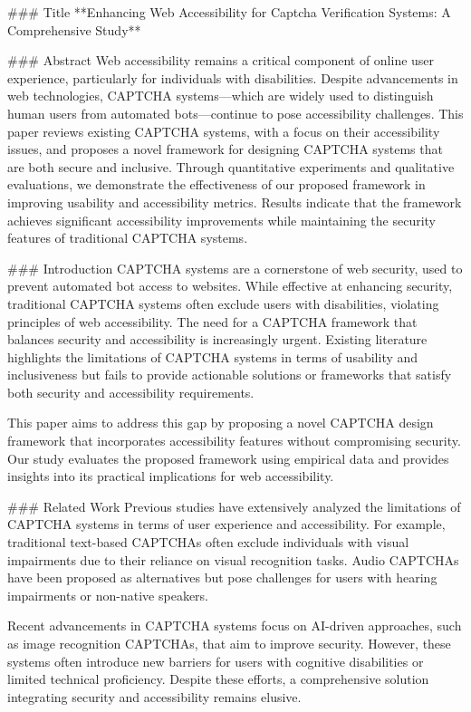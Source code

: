 ### Title  
**Enhancing Web Accessibility for Captcha Verification Systems: A Comprehensive Study**

### Abstract  
Web accessibility remains a critical component of online user experience, particularly for individuals with disabilities. Despite advancements in web technologies, CAPTCHA systems—which are widely used to distinguish human users from automated bots—continue to pose accessibility challenges. This paper reviews existing CAPTCHA systems, with a focus on their accessibility issues, and proposes a novel framework for designing CAPTCHA systems that are both secure and inclusive. Through quantitative experiments and qualitative evaluations, we demonstrate the effectiveness of our proposed framework in improving usability and accessibility metrics. Results indicate that the framework achieves significant accessibility improvements while maintaining the security features of traditional CAPTCHA systems.

### Introduction  
CAPTCHA systems are a cornerstone of web security, used to prevent automated bot access to websites. While effective at enhancing security, traditional CAPTCHA systems often exclude users with disabilities, violating principles of web accessibility. The need for a CAPTCHA framework that balances security and accessibility is increasingly urgent. Existing literature highlights the limitations of CAPTCHA systems in terms of usability and inclusiveness but fails to provide actionable solutions or frameworks that satisfy both security and accessibility requirements.

This paper aims to address this gap by proposing a novel CAPTCHA design framework that incorporates accessibility features without compromising security. Our study evaluates the proposed framework using empirical data and provides insights into its practical implications for web accessibility.

### Related Work  
Previous studies have extensively analyzed the limitations of CAPTCHA systems in terms of user experience and accessibility. For example, traditional text-based CAPTCHAs often exclude individuals with visual impairments due to their reliance on visual recognition tasks. Audio CAPTCHAs have been proposed as alternatives but pose challenges for users with hearing impairments or non-native speakers.

Recent advancements in CAPTCHA systems focus on AI-driven approaches, such as image recognition CAPTCHAs, that aim to improve security. However, these systems often introduce new barriers for users with cognitive disabilities or limited technical proficiency. Despite these efforts, a comprehensive solution integrating security and accessibility remains elusive.

